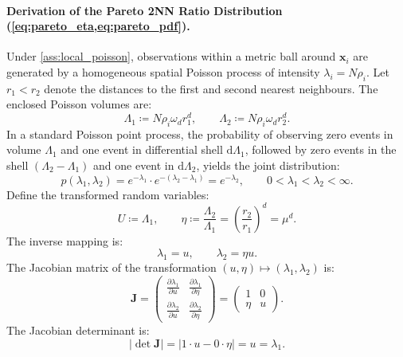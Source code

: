 \paragraph{Derivation of the Pareto 2NN Ratio Distribution
(\cref{eq:pareto_eta,eq:pareto_pdf}).}
Under \cref{ass:local_poisson}, observations within a
metric ball around $\mathbf{x}_i$
are generated by a homogeneous spatial Poisson process of intensity
$\lambda_i = N \rho_i$.
Let $r_1 < r_2$ denote the distances to the first and second nearest
neighbours.
The enclosed Poisson volumes are:
\begin{equation}
  \Lambda_1 \coloneqq N \rho_i \omega_d r_1^d, \qquad \Lambda_2
  \coloneqq N \rho_i \omega_d r_2^d.
\end{equation}
In a standard Poisson point process, the probability of observing
zero events in volume $\Lambda_1$
and one event in differential shell $\mathrm{d}\Lambda_1$, followed
by zero events in the shell
$(\Lambda_2 - \Lambda_1)$ and one event in $\mathrm{d}\Lambda_2$,
yields the joint distribution:
\begin{equation}
  p(\lambda_1, \lambda_2) = e^{-\lambda_1} \cdot e^{-(\lambda_2 -
  \lambda_1)} = e^{-\lambda_2}, \qquad 0 < \lambda_1 < \lambda_2 < \infty.
  \label{eq:supp_joint_poisson_shells}
\end{equation}
Define the transformed random variables:
\begin{equation}
  U \coloneqq \Lambda_1, \qquad \eta \coloneqq
  \frac{\Lambda_2}{\Lambda_1} = \left(\frac{r_2}{r_1}\right)^{\!d} = \mu^d.
\end{equation}
The inverse mapping is:
\begin{equation}
  \lambda_1 = u, \qquad \lambda_2 = \eta u.
\end{equation}
The Jacobian matrix of the transformation $(u, \eta) \mapsto
(\lambda_1, \lambda_2)$ is:
\begin{equation}
  \mathbf{J} =
  \begin{pmatrix}
    \frac{\partial \lambda_1}{\partial u} & \frac{\partial
    \lambda_1}{\partial \eta} \\
    \frac{\partial \lambda_2}{\partial u} & \frac{\partial
    \lambda_2}{\partial \eta}
  \end{pmatrix} =
  \begin{pmatrix}
    1 & 0 \\
    \eta & u
  \end{pmatrix}.
\end{equation}
The Jacobian determinant is:
\begin{equation}
  |\det \mathbf{J}| = |1 \cdot u - 0 \cdot \eta| = u = \lambda_1.
\end{equation}
